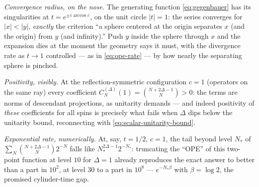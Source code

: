 \begin{eexample}
\emph{Convergence radius, on the nose.} The generating function
\eqref{eq:gegenbauer} has its singularities at $t = e^{\pm i \arccos c}$, on
the unit circle $|t| = 1$: the series converges for $|x| < |y|$,
\emph{exactly} the criterion ``a sphere centered at the origin separates $x$
(and the origin) from $y$ (and infinity).'' Push $y$ inside the sphere
through $x$ and the expansion dies at the moment the geometry says it must,
with the divergence rate as $t \to 1$ controlled --- as in
\eqref{eq:ope-rate} --- by how nearly the separating sphere is pinched.

\emph{Positivity, visibly.} At the reflection-symmetric configuration $c = 1$
(operators on the same ray) every coefficient $C_N^{(\Delta)}(1) =
\binom{N + 2\Delta - 1}{N} > 0$: the terms are norms of descendant
projections, as unitarity demands --- and indeed positivity of \emph{these}
coefficients for all spins is precisely what fails when $\Delta$ dips below
the unitarity bound, reconnecting with \eqref{eq:scalar-unitarity-bound}.

\emph{Exponential rate, numerically.} At, say, $t = 1/2$, $c = 1$, the tail
beyond level $N_*$ of $\sum_N \binom{N+2\Delta-1}{N} 2^{-N}$ falls like
$N_*^{2\Delta - 1} 2^{-N_*}$: truncating the ``OPE'' of this two-point
function at level $10$ for $\Delta = 1$ already reproduces the exact answer
to better than a part in $10^2$, at level $30$ to a part in $10^8$ ---
$e^{-N_* \beta}$ with $\beta = \log 2$, the promised cylinder-time gap.
\end{eexample}

